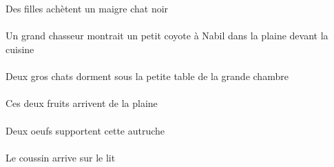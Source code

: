 \begin{exe}
\ex\gll
\INDPlErg{}   \filleCPlErg{}   \INDSgAbs{}   \maigreDSg{}   \noirDSg{}   \chatDSgAbs{}  \acheterVtPrsDSg{}\\
\INDPlErgP{}   \filleCPlErgP{}   \INDSgAbsP{}   \maigreDSgP{}   \noirDSgP{}   \chatDSgAbsP{}  \acheterVtPrsDSgP{}\\
Des filles achètent un maigre chat noir
\ex\gll
\DEFSgObl{}    \DEFSgObl{}   \cuisineCSgObl{}   \DEVANT{}   \plaineCSgObl{}   \DANS{}   \INDSgErg{}   \grandCSg{}   \chasseurCSgErg{}    \INDSgDat{}   \NabilBSgDat{}   \INDSgAbs{}   \petitASg{}   \coyoteASgAbs{}  \montrerVdPstASg{}\\
\DEFSgOblP{}    \DEFSgOblP{}   \cuisineCSgOblP{}   \DEVANTP{}   \plaineCSgOblP{}   \DANSP{}   \INDSgErgP{}   \grandCSgP{}   \chasseurCSgErgP{}    \INDSgDatP{}   \NabilBSgDatP{}   \INDSgAbsP{}   \petitASgP{}   \coyoteASgAbsP{}  \montrerVdPstASgP{}\\
Un grand chasseur montrait un petit coyote à Nabil dans la plaine devant la cuisine
\ex\gll
\INDDuAbs{}   \grosDDu{}   \chatDDuAbs{}    \DEFSgObl{}    \DEFSgObl{}   \grandBSg{}   \chambreBSgObl{}   \DE{}   \petitCSg{}   \tableCSgObl{}   \SOUS{}  \dormirViPrsDDu{}\\
\INDDuAbsP{}   \grosDDuP{}   \chatDDuAbsP{}    \DEFSgOblP{}    \DEFSgOblP{}   \grandBSgP{}   \chambreBSgOblP{}   \DEP{}   \petitCSgP{}   \tableCSgOblP{}   \SOUSP{}  \dormirViPrsDDuP{}\\
Deux gros chats dorment sous la petite table de la grande chambre
\ex\gll
\DEMDuAbs{}   \fruitBDuAbs{}    \DEFSgObl{}   \plaineCSgObl{}   \DE{}  \arriverViPrsBDu{}\\
\DEMDuAbsP{}   \fruitBDuAbsP{}    \DEFSgOblP{}   \plaineCSgOblP{}   \DEP{}  \arriverViPrsBDuP{}\\
Ces deux fruits arrivent de la plaine
\ex\gll
\INDDuErg{}   \oeufDDuErg{}   \DEMSgAbs{}   \autrucheDSgAbs{}  \supporterVtPrsDSg{}\\
\INDDuErgP{}   \oeufDDuErgP{}   \DEMSgAbsP{}   \autrucheDSgAbsP{}  \supporterVtPrsDSgP{}\\
Deux oeufs supportent cette autruche
\ex\gll
\DEFSgAbs{}   \coussinASgAbs{}    \DEFSgObl{}   \litDSgObl{}   \SUR{}  \arriverViPrsASg{}\\
\DEFSgAbsP{}   \coussinASgAbsP{}    \DEFSgOblP{}   \litDSgOblP{}   \SURP{}  \arriverViPrsASgP{}\\
Le coussin arrive sur le lit
\ex\gll
\INDSgErg{}   \petitDSg{}   \blancDSg{}   \autrucheDSgErg{}    \DEFSgObl{}   \maisonDSgObl{}   \DEVANT{}   \INDSgAbs{}   \noirBSg{}   \theBSgAbs{}  \boireVtPrsBSg{}\\

\end{exe}
